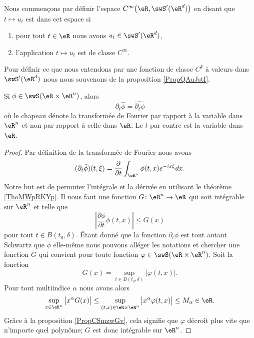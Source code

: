 Nous commençons par définir l'espace \(  C^{\infty}\big( \eR,\swS'(\eR^d) \big)\) en disant que \( t\mapsto u_t\) est dans cet espace si
\begin{enumerate}
    \item
        pour tout \( t\in \eR\) nous avons \( u_t\in \swS'(\eR^d)\),
    \item
        l'application \( t\mapsto u_t\) est de classe \(  C^{\infty}\).
\end{enumerate}
Pour définir ce que nous entendons par une fonction de classe \( C^k\) à valeurs dans \( \swS'(\eR^d)\) nous nous souvenons de la proposition \ref{PropQAuJstI}.

\begin{lemma}
    Si \( \phi\in\swS(\eR\times \eR^n)\), alors
    \begin{equation}
        \partial_t\hat\phi=\widehat{\partial_t\phi}
    \end{equation}
    où le chapeau dénote la transformée de Fourier par rapport à la variable dans \( \eR^n\) et non par rapport à celle dans \( \eR\). Le \( t\) par contre est la variable dans \( \eR\).
\end{lemma}

\begin{proof}
    Par définition de la transformée de Fourier nous avons
    \begin{equation}
        (\partial_t\hat\phi)(t,\xi)=\frac{ \partial  }{ \partial t }\int_{\eR^n}\phi(t,x) e^{-i x\xi}dx.
    \end{equation}
    Notre but est de permuter l'intégrale et la dérivée en utilisant le théorème \ref{ThoMWpRKYp}. Il nous faut une fonction \( G\colon \eR^n\to \eR\) qui soit intégrable sur \( \eR^n\) et telle que
    \begin{equation}
        \left| \frac{ \partial \phi }{ \partial t }\phi(t,x) \right| \leq G(x)
    \end{equation}
    pour tout \( t\in B(t_0,\delta)\). Étant donné que la fonction \( \partial_t\phi\) est tout autant Schwartz que \( \phi\) elle-même nous pouvons alléger les notations et chercher une fonction \( G\) qui convient pour toute fonction \( \varphi\in\swS(\eR\times \eR^n)\). Soit la fonction
    \begin{equation}
        G(x)=\sup_{t\in B(t_0,\delta)}| \varphi(t,x) |.
    \end{equation}
    Pour tout multiindice \( \alpha\) nous avons alors
    \begin{equation}
        \sup_{x\in \eR^n}\big| x^{\alpha}G(x) \big|\leq \sup_{(t,x)\in \eR\times \eR^n}\big| x^{\alpha}\varphi(t,x) \big|\leq M_{\alpha}\in \eR.
    \end{equation}
    Grâce à la proposition \ref{PropCSmzwGv}, cela signifie que \( \varphi\) décroît plus vite que n'importe quel polynôme; \( G\) est donc intégrable sur \( \eR^n\).
\end{proof}

